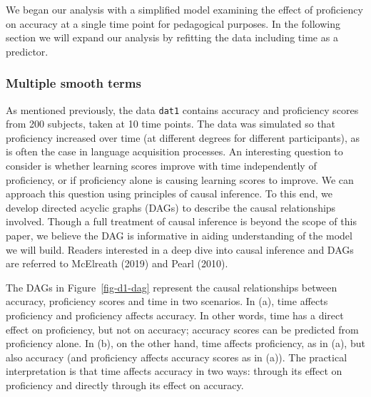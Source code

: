 \documentclass[
  letterpaper,
  DIV=11,
  numbers=noendperiod]{scrartcl}
\begin{document}
We began our analysis with a simplified model examining the effect of
proficiency on accuracy at a single time point for pedagogical purposes.
In the following section we will expand our analysis by refitting the
data including time as a predictor.

\subsubsection{Multiple smooth terms}\label{multiple-smooth-terms}

As mentioned previously, the data \texttt{dat1} contains accuracy and
proficiency scores from 200 subjects, taken at 10 time points. The data
was simulated so that proficiency increased over time (at different
degrees for different participants), as is often the case in language
acquisition processes. An interesting question to consider is whether
learning scores improve with time independently of proficiency, or if
proficiency alone is causing learning scores to improve. We can approach
this question using principles of causal inference. To this end, we
develop directed acyclic graphs (DAGs) to describe the causal
relationships involved. Though a full treatment of causal inference is
beyond the scope of this paper, we believe the DAG is informative in
aiding understanding of the model we will build. Readers interested in a
deep dive into causal inference and DAGs are referred to McElreath
(2019) and Pearl (2010).

The DAGs in Figure~\ref{fig-d1-dag} represent the causal relationships
between accuracy, proficiency scores and time in two scenarios. In (a),
time affects proficiency and proficiency affects accuracy. In other
words, time has a direct effect on proficiency, but not on accuracy;
accuracy scores can be predicted from proficiency alone. In (b), on the
other hand, time affects proficiency, as in (a), but also accuracy (and
proficiency affects accuracy scores as in (a)). The practical
interpretation is that time affects accuracy in two ways: through its
effect on proficiency and directly through its effect on accuracy.
\end{document}
